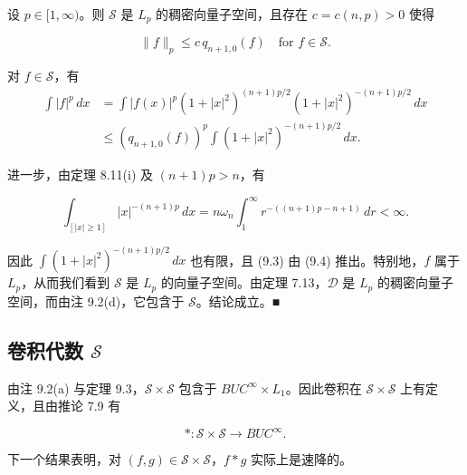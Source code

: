 \begin{theorem}

设 $ p \in [1,\infty) $。则 $ \mathcal{S} $ 是 $ L_p $ 的稠密向量子空间，且存在 $ c = c(n,p) > 0 $ 使得

\begin{equation}
\|f\|_p \le c\,q_{n+1,0}(f) \quad \text{for } f \in \mathcal{S} .\tag{9.3}
\end{equation}

\proofhead
对 $ f \in \mathcal{S} $，有
\begin{equation}
\begin{aligned}
\int |f|^p\,dx &= \int |f(x)|^p(1+|x|^2)^{(n+1)p/2}(1+|x|^2)^{-(n+1)p/2}\,dx \\ &\le (q_{n+1,0}(f))^p\int (1+|x|^2)^{-(n+1)p/2}\,dx .
\end{aligned}\tag{9.4}
\end{equation}

进一步，由定理 8.11(i) 及 $ (n+1)p > n $，有

\[
\int_{[|x| \ge 1]}|x|^{-(n+1)p}\,dx = n\omega_n\int_1^{\infty} r^{-((n+1)p-n+1)}\,dr < \infty .
\]

因此 $ \int(1+|x|^2)^{-(n+1)p/2}\,dx $ 也有限，且 (9.3) 由 (9.4) 推出。特别地，$ f $ 属于 $ L_p $，从而我们看到 $ \mathcal{S} $ 是 $ L_p $ 的向量子空间。由定理 7.13，$ \mathcal{D} $ 是 $ L_p $ 的稠密向量子空间，而由注 9.2(d)，它包含于 $ \mathcal{S} $。结论成立。\nobreak\hspace{0.35em}■

\end{theorem}

\subsection*{卷积代数 $ \mathcal{S} $}

由注 9.2(a) 与定理 9.3，$ \mathcal{S}\times\mathcal{S} $ 包含于 $ BUC^{\infty}\times L_1 $。因此卷积在 $ \mathcal{S}\times\mathcal{S} $ 上有定义，且由推论 7.9 有

\begin{equation}
*: \mathcal{S}\times\mathcal{S} \to BUC^{\infty} .\tag{9.5}
\end{equation}

下一个结果表明，对 $ (f,g) \in \mathcal{S}\times\mathcal{S} $，$ f*g $ 实际上是速降的。


